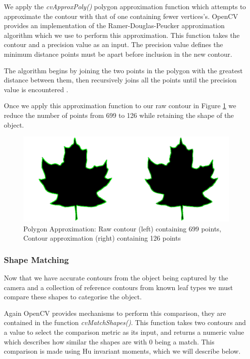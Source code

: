 We apply the \emph{cvApproxPoly()} polygon approximation function which attempts to approximate the contour with that of one containing fewer vertices's. OpenCV provides an implementation of the Ramer-Douglas-Peucker approximation algorithm which we use to perform this approximation. This function takes the contour and a precision value as an input. The precision value defines the minimum distance points must be apart before inclusion in the new contour.

The algorithm begins by joining the two points in the polygon with the greatest distance between them, then recursively joins all the points until the precision value is encountered \cite{ramer72, bradski08}.

Once we apply this approximation function to our raw contour in Figure \ref{contours_raw_approx} we reduce the number of points from 699 to 126 while retaining the shape of the object.

\begin{figure}[h!]
\centering
    \includegraphics[width=1\textwidth]{leaf_identification/images/contours_raw_approx.png}
    \caption{Polygon Approximation: Raw contour (left) containing 699 points, Contour approximation (right) containing 126 points}%
    \label{contours_raw_approx}
\end{figure}

\subsubsection{Shape Matching}
Now that we have accurate contours from the object being captured by the camera and a collection of reference contours from known leaf types we must compare these shapes to categorise the object.

Again OpenCV provides mechanisms to perform this comparison, they are contained in the function \emph{cvMatchShapes()}. This function takes two contours and a value to select the comparison metric as its input, and returns a numeric value which describes how similar the shapes are with 0 being a match. This comparison is made using Hu invariant moments, which we will describe below.

